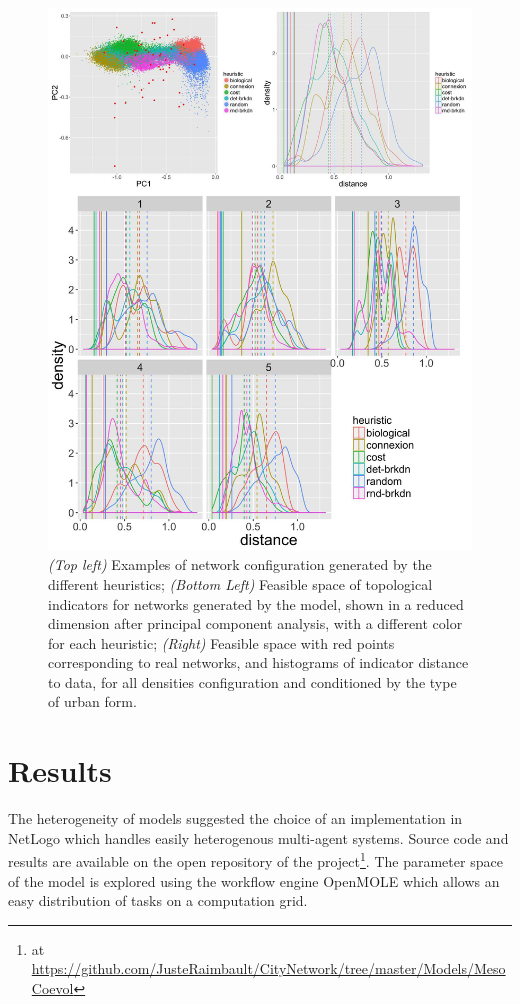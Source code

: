 \documentclass[letterpaper]{article}
\begin{document}
\begin{figure}[h!]
\begin{minipage}[c]{0.55\linewidth}
\includegraphics[width=\linewidth]{figures/7-1-2-fig-networkgrowth-realdistance.jpg}
\end{minipage}
\caption{\textit{(Top left)} Examples of network configuration generated by the different heuristics; \textit{(Bottom Left)} Feasible space of topological indicators for networks generated by the model, shown in a reduced dimension after principal component analysis, with a different color for each heuristic; \textit{(Right)} Feasible space with red points corresponding to real networks, and histograms of indicator distance to data, for all densities configuration and conditioned by the type of urban form.}
\label{fig:fig1}
\end{figure}

\section{Results}

The heterogeneity of models suggested the choice of an implementation in NetLogo which handles easily heterogenous multi-agent systems. Source code and results are available on the open repository of the project\footnote{at \url{https://github.com/JusteRaimbault/CityNetwork/tree/master/Models/MesoCoevol}}. The parameter space of the model is explored using the workflow engine OpenMOLE \citep{reuillon2013openmole} which allows an easy distribution of tasks on a computation grid.
\end{document}
